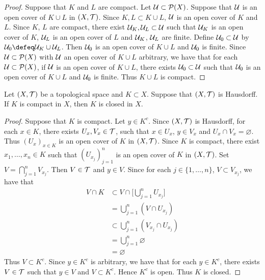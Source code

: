 \documentclass{book}
\begin{document}
	\begin{proof}
		Suppose that $K$ and $L$ are compact. Let $\mathcal{U} \subset \mathcal{P}(X)$. Suppose that $\mathcal{U}$ is an open cover of $K \cup L$ in $(X, \mathcal{T})$. Since $K,L \subset K \cup L$, $\mathcal{U}$ is an open cover of $K$ and $L$. Since $K$, $L$ are compact, there exist $\mathcal{U}_K, \mathcal{U}_L \subset \mathcal{U}$ such that $\mathcal{U}_K$ is an open cover of $K$, $\mathcal{U}_L$ is an open cover of $L$ and $\mathcal{U}_K$, $\mathcal{U}_L$ are finite. Define $\mathcal{U}_0 \subset \mathcal{U}$ by $\MU_0 \defeq \MU_K \cup \MU_L$. Then $\mathcal{U}_0$ is an open cover of $K \cup L$ and $\mathcal{U}_0$ is finite. Since $\mathcal{U} \subset \mathcal{P}(X)$ with $\mathcal{U}$ an open cover of $K \cup L$ arbitrary, we have that for each $\mathcal{U} \subset \mathcal{P}(X)$, if $\mathcal{U}$ is an open cover of $K \cup L$, there exists $\mathcal{U}_0 \subset \mathcal{U}$ such that $\mathcal{U}_0$ is an open cover of $K \cup L$ and $\mathcal{U}_0$ is finite. Thus $K \cup L$ is compact. 
  	\end{proof}
	
	\begin{ex} 
		Let $(X, \mathcal{T})$ be a topological space and $K \subset X$. Suppose that $(X, \mathcal{T})$ is Hausdorff. If $K$ is compact in $X$, then $K$ is closed in $X$.
	\end{ex}

	\begin{proof}
		Suppose that $K$ is compact. Let $y \in K^c$. Since $(X, \mathcal{T})$ is Hausdorff, for each $x \in K$, there exists $U_x, V_x \in \mathcal{T}$, such that $x \in U_x$, $y \in V_x$ and $U_x \cap V_x = \varnothing$. Thus $(U_x)_{x \in K}$ is an open cover of $K$ in $(X, \mathcal{T})$. Since $K$ is compact, there exist $x_1, \ldots, x_n \in K$ such that $(U_{x_j})_{j=1}^n$ is an open cover of $K$ in $(X, \mathcal{T})$. Set $V = \bigcap\limits_{j=1}^n V_{x_j}$. Then $V \in \mathcal{T}$ and $y \in V$. Since for each $j \in \{1, \ldots, n\}$, $V \subset V_{x_j}$, we have that
		\begin{align*}
			V \cap K
			& \subset V \cap \bigg[ \bigcup_{j=1}^n U_{x_j} \bigg] \\
			& = \bigcup_{j=1}^n ( V \cap U_{x_j}) \\
			& \subset \bigcup_{j=1}^n (V_{x_j} \cap U_{x_j}) \\
			& = \bigcup_{j=1}^n \varnothing \\
			& = \varnothing
		\end{align*}
		Thus $V \subset K^c$. Since $y \in K^c$ is arbitrary, we have that for each $y \in K^c$, there exists $V \in \mathcal{T}$ such that $y \in V$ and $V \subset K^c$. Hence $K^c$ is open. Thus $K$ is closed.
	\end{proof}
	
\end{document}
